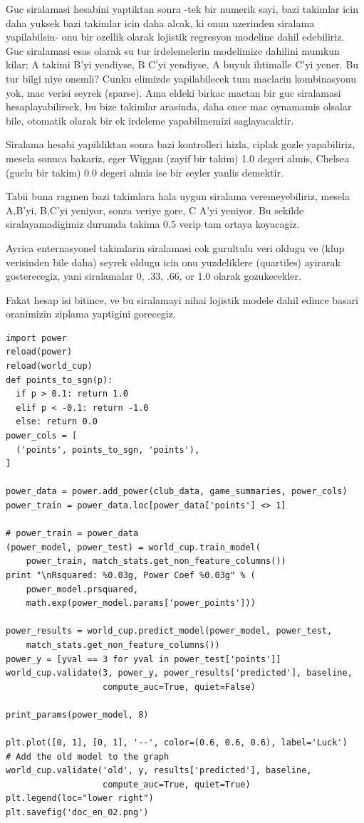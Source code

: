 \documentclass[12pt,fleqn]{article}\usepackage{../common}
\begin{document}
Guc siralamasi hesabini yaptiktan sonra -tek bir numerik sayi, bazi
takimlar icin daha yuksek bazi takimlar icin daha alcak, ki onun uzerinden
siralama yapilabilsin- onu bir ozellik olarak lojistik regresyon modeline
dahil edebiliriz. Guc siralamasi esas olarak su tur irdelemelerin modelimize
dahilini mumkun kilar; A takimi B'yi yendiyse, B C'yi yendiyse, A buyuk
ihtimalle C'yi yener. Bu tur bilgi niye onemli?  Cunku elimizde
yapilabilecek tum maclarin kombinasyonu yok, mac verisi seyrek
(sparse). Ama eldeki birkac mactan bir guc siralamasi hesaplayabilirsek, bu
bize takimlar arasinda, daha once mac oynamamis olsalar bile, otomatik
olarak bir ek irdeleme yapabilmemizi saglayacaktir.

Siralama hesabi yapildiktan sonra bazi kontrolleri hizla, ciplak gozle
yapabiliriz, mesela sonuca bakariz, eger Wiggan (zayif bir takim) 1.0
degeri almis, Chelsea (guclu bir takim) 0.0 degeri almis ise bir seyler
yanlis demektir.

Tabii buna ragmen bazi takimlara hala uygun siralama veremeyebiliriz,
mesela A,B'yi, B,C'yi yeniyor, sonra veriye gore, C A'yi yeniyor. Bu
sekilde siralayamadigimiz durumda takima 0.5 verip tam ortaya koyacagiz.

Ayrica enternasyonel takimlarin siralamasi cok gurultulu veri oldugu ve
(klup verisinden bile daha) seyrek oldugu icin onu yuzdeliklere (quartiles)
ayirarak gosterecegiz, yani siralamalar 0, .33, .66, or 1.0 olarak
gozukecekler.

Fakat hesap isi bitince, ve bu siralamayi nihai lojistik modele dahil
edince basari oranimizin ziplama yaptigini gorecegiz.

\begin{verbatim}
import power
reload(power)
reload(world_cup)
def points_to_sgn(p):
  if p > 0.1: return 1.0
  elif p < -0.1: return -1.0
  else: return 0.0
power_cols = [
  ('points', points_to_sgn, 'points'),
]

power_data = power.add_power(club_data, game_summaries, power_cols)
power_train = power_data.loc[power_data['points'] <> 1] 

# power_train = power_data
(power_model, power_test) = world_cup.train_model(
    power_train, match_stats.get_non_feature_columns())
print "\nRsquared: %0.03g, Power Coef %0.03g" % (
    power_model.prsquared, 
    math.exp(power_model.params['power_points']))

power_results = world_cup.predict_model(power_model, power_test, 
    match_stats.get_non_feature_columns())
power_y = [yval == 3 for yval in power_test['points']]
world_cup.validate(3, power_y, power_results['predicted'], baseline, 
                   compute_auc=True, quiet=False)

print_params(power_model, 8)

plt.plot([0, 1], [0, 1], '--', color=(0.6, 0.6, 0.6), label='Luck')
# Add the old model to the graph
world_cup.validate('old', y, results['predicted'], baseline, 
                   compute_auc=True, quiet=True)
plt.legend(loc="lower right")
plt.savefig('doc_en_02.png')
\end{verbatim}
\end{document}

